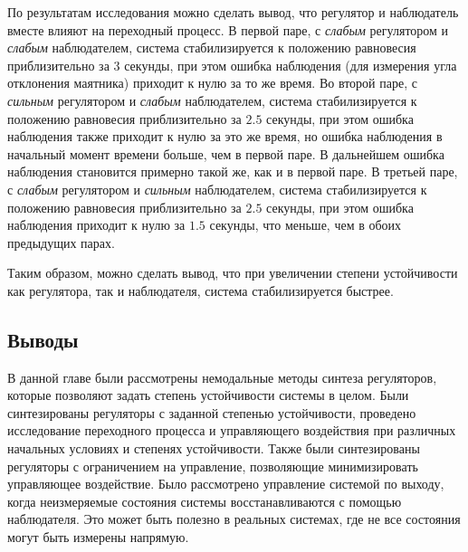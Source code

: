 \FloatBarrier
По результатам исследования можно сделать вывод, что регулятор и наблюдатель вместе влияют на переходный процесс.
В первой паре, с \textit{слабым} регулятором и \textit{слабым} наблюдателем, система стабилизируется к положению равновесия
приблизительно за $3$ секунды, при этом ошибка наблюдения (для измерения угла отклонения маятника) приходит к нулю
за то же время. Во второй паре, с \textit{сильным} регулятором и \textit{слабым} наблюдателем, система стабилизируется
к положению равновесия приблизительно за $2.5$ секунды, при этом ошибка наблюдения также приходит к нулю за это же время, 
но ошибка наблюдения в начальный момент времени больше, чем в первой паре. В дальнейшем ошибка наблюдения становится 
примерно такой же, как и в первой паре. В третьей паре, с \textit{слабым} регулятором и \textit{сильным} наблюдателем,
система стабилизируется к положению равновесия приблизительно за $2.5$ секунды, при этом ошибка наблюдения
приходит к нулю за $1.5$ секунды, что меньше, чем в обоих предыдущих парах. 

Таким образом, можно сделать вывод, что при увеличении степени устойчивости как регулятора, так и наблюдателя,
система стабилизируется быстрее.

\subsection{Выводы}
В данной главе были рассмотрены немодальные методы синтеза регуляторов, которые позволяют задать степень устойчивости системы в целом.
Были синтезированы регуляторы с заданной степенью устойчивости, проведено исследование переходного процесса и управляющего воздействия при различных начальных условиях и степенях устойчивости.
Также были синтезированы регуляторы с ограничением на управление, позволяющие минимизировать управляющее воздействие.
Было рассмотрено управление системой по выходу, когда неизмеряемые состояния системы восстанавливаются с помощью наблюдателя. 
Это может быть полезно в реальных системах, где не все состояния могут быть измерены напрямую. 
